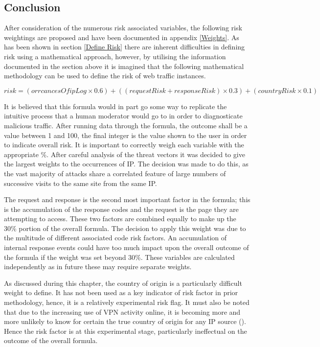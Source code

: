 \subsection{Conclusion}

After consideration of the numerous risk associated variables, the following risk weightings are proposed and have been documented in appendix \ref{Weights}. As has been shown in section \ref{Define Risk} there are inherent difficulties in defining risk using a mathematical approach, however, by utilising the information documented in the section above it is imagined that the following mathematical methodology can be used to define the risk of web traffic instances. 

\[risk = (orrcancesOfipLog \times 0.6) + ((requestRisk+responseRisk) \times 0.3) + (countryRisk \times  0.1) \]

It is believed that this formula would in part go some way to replicate the intuitive process that a human moderator would go to in order to diagnosticate malicious traffic. After running data through the formula, the outcome shall be a value between 1 and 100, the final integer is the value shown to the user in order to indicate overall risk. It is important to correctly weigh each variable with the appropriate \%. After careful analysis of the threat vectors it was decided to give the largest weights to the occurrences of IP. The decision was made to do this, as the vast majority of attacks share a correlated feature of large numbers of successive visits to the same site from the same IP. 

The request and response is the second most important factor in the formula; this is the accumulation of the response codes and the request is the page they are attempting to access. These two factors are combined equally to make up the 30\% portion of the overall formula. The decision to apply this weight was due to the multitude of different associated code risk factors. An accumulation of internal response events could have too much impact upon the overall outcome of the formula if the weight was set beyond 30\%. These variables are calculated independently as in future these may require separate weights.

As discussed during this chapter, the country of origin is a particularly difficult weight to define. It has not been used as a key indicator of risk factor in prior methodology, hence, it is a relatively experimental risk flag. It must also be noted that due to the increasing use of VPN activity online, it is becoming more and more unlikely to know for certain the true country of origin for any IP source (\cite{GoGlobe}). Hence the risk factor is at this experimental stage, particularly ineffectual on the outcome of the overall formula.

